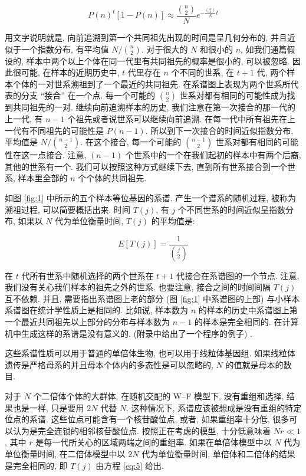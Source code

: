 \documentclass[12pt]{article}
\begin{document}
\begin{equation} \label{eq:4}
    P(n)^{t}[1-P(n)] \approx \frac{\binom{n}{2}}{N} e^{-\frac{\binom{n}{2}}{N}t}
\end{equation}

用文字说明就是, 向前追溯到第一个共同祖先出现的时间是呈几何分布的, 并且近似于一个指数分布, 有平均值 $N/\binom{n}{2}$.
对于很大的 $N$ 和很小的 $n$, 如我们通篇假设的,
样本中两个以上个体在同一代里有共同祖先的概率是很小的, 可以被忽略.
因此很可能, 在样本的近期历史中, $t$ 代里存在 $n$ 个不同的世系, 在 $t+1$ 代,
两个样本个体的一对世系溯祖到了一个最近的共同祖先.
在系谱图上表现为两个世系所代表的分支 ``接合'' 在一个点.
每一个可能的 $\binom{n}{2}$ 世系对都有相同的可能性成为找到共同祖先的一对.
继续向前追溯样本的历史, 我们注意在第一次接合的那一代的上一代, 有 $n-1$ 个祖先或者说世系可以继续向前追溯.
在每一代中所有祖先在上一代有不同祖先的可能性是 $P(n-1)$.
所以到下一次接合的时间近似指数分布, 平均值是 $N/\binom{n-1}{2}$. 在这个接合,
每一个可能的 $\binom{n-1}{2}$ 世系对都有相同的可能性在这一点接合.
注意, $(n-1)$ 个世系中的一个在我们起初的样本中有两个后裔, 其他的世系有一个.
我们可以按照这种方式继续下去, 直到所有世系接合到一个世系, 样本里全部的 $n$ 个个体的共同祖先.

如图 \ref{fig:1} 中所示的五个样本等位基因的系谱. 产生一个谱系的随机过程, 被称为溯祖过程, 可以简要概括出来.
时间 $T(j)$, 有 $j$ 个不同世系的时间近似呈指数分布, 如果以 $N$ 代为单位衡量时间, $T(j)$ 的平均值是:

\begin{equation} \label{eq:5}
    E[T(j)]=\frac{1}{\binom{j}{2}}
\end{equation}

在 $t$ 代所有世系中随机选择的两个世系在 $t+1$ 代接合在系谱图的一个节点.
注意, 我们没有关心我们样本的祖先之外的世系. 也要注意, 接合之间的时间间隔 $T(j)$ 互不依赖.
并且, 需要指出系谱图上老的部分 (图 \ref{fig:1} 中系谱图的上部) 与小样本系谱图在统计学性质上是相同的.
比如说, 样本数为 $n$ 的样本的历史中系谱图上第一个最近共同祖先以上部分的分布与样本数为 $n-1$ 的样本是完全相同的.
在计算机中生成这样的系谱是没有意义的. (附录中给出了一个程序的例子) .

这些系谱性质可以用于普通的单倍体生物, 也可以用于线粒体基因组.
如果线粒体遗传是严格母系的并且母本个体内的多态性是可以忽略的, $N$ 的值就是母本的数目.

对于 $N$ 个二倍体个体的大群体, 在随机交配的 W--F 模型下, 没有重组和选择, 结果也是一样, 只是要用 $2N$ 代替 $N$.
这种情况下, 系谱应该被想成是没有重组的特定位点的系谱. 这些位点可能含有一个核苷酸位点, 或者, 如果重组率十分低,
很多可以认为是完全连锁的相邻核苷酸位点.
按照正在考虑的模型, 十分低意味着 $Nr\ll 1$, 其中 $r$ 是每一代所关心的区域两端之间的重组率.
如果在单倍体模型中以 $N$ 代为单位衡量时间, 在二倍体模型中以 $2N$ 代为单位衡量时间,
单倍体和二倍体的结果是完全相同的, 即 $T(j)$ 由方程 \ref{eq:5} 给出.
\end{document}
